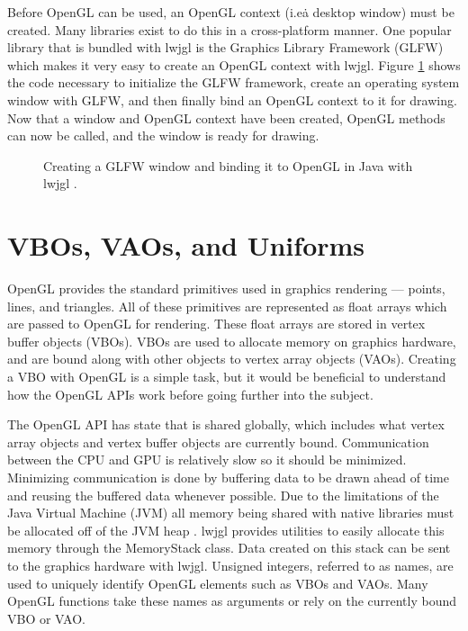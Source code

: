 \documentclass{article}
\begin{document}
Before OpenGL can be used, an OpenGL context (i.e\. a desktop window) must be created. Many libraries exist to do this in a cross-platform manner. One popular library that is bundled with lwjgl is the Graphics Library Framework (GLFW) which makes it very easy to create an OpenGL context with lwjgl. Figure \ref{fig:glfw-creation} shows the code necessary to initialize the GLFW framework, create an operating system window with GLFW, and then finally bind an OpenGL context to it for drawing. Now that a window and OpenGL context have been created, OpenGL methods can now be called, and the window is ready for drawing.

\begin{figure}[h]
	
	\caption{Creating a GLFW window and binding it to OpenGL in Java with lwjgl \cite{lwjgl}.}
	\label{fig:glfw-creation}
\end{figure}

\section{VBOs, VAOs, and Uniforms}
OpenGL provides the standard primitives used in graphics rendering --- points, lines, and triangles. All of these primitives are represented as float arrays which are passed to OpenGL for rendering. These float arrays are stored in vertex buffer objects (VBOs). VBOs are used to allocate memory on graphics hardware, and are bound along with other objects to vertex array objects (VAOs). Creating a VBO with OpenGL is a simple task, but it would be beneficial to understand how the OpenGL APIs work before going further into the subject.

The OpenGL API has state that is shared globally, which includes what vertex array objects and vertex buffer objects are currently bound. Communication between the CPU and GPU is relatively slow so it should be minimized. Minimizing communication is done by buffering data to be drawn ahead of time and reusing the buffered data whenever possible. Due to the limitations of the Java Virtual Machine (JVM) all memory being shared with native libraries must be allocated off of the JVM heap \cite{lwjglwiki}. lwjgl provides utilities to easily allocate this memory through the MemoryStack class. Data created on this stack can be sent to the graphics hardware with lwjgl. Unsigned integers, referred to as names, are used to uniquely identify OpenGL elements such as VBOs and VAOs. Many OpenGL functions take these names as arguments or rely on the currently bound VBO or VAO.
\end{document}
